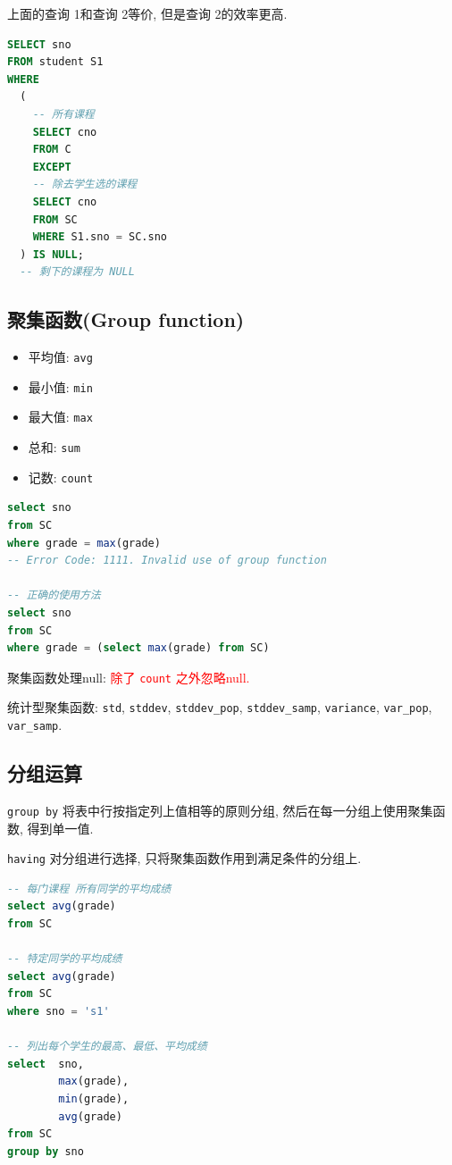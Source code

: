 上面的查询 1和查询 2等价, 但是查询 2的效率更高.

\begin{lstlisting}[language=SQL, caption={求出选修所有课程的同学}]
SELECT sno
FROM student S1
WHERE
  (
    -- 所有课程
    SELECT cno
    FROM C
    EXCEPT
    -- 除去学生选的课程
    SELECT cno
    FROM SC
    WHERE S1.sno = SC.sno
  ) IS NULL;
  -- 剩下的课程为 NULL
\end{lstlisting}

\subsection{聚集函数(Group function)}

\begin{itemize}
  \item 平均值: \verb|avg|
  \item 最小值: \verb|min|
  \item 最大值: \verb|max|
  \item 总和: \verb|sum|
  \item 记数: \verb|count|
\end{itemize}

\begin{lstlisting}[language=SQL, caption={聚集函数最容易犯的语法错误}]
select sno
from SC
where grade = max(grade)
-- Error Code: 1111. Invalid use of group function

-- 正确的使用方法
select sno
from SC
where grade = (select max(grade) from SC)
\end{lstlisting}

聚集函数处理null: \textcolor{red}{除了 \texttt{count} 之外忽略null.}

统计型聚集函数: \verb|std|, \verb|stddev|, \verb|stddev_pop|, \verb|stddev_samp|,
\verb|variance|, \verb|var_pop|, \verb|var_samp|.

\subsection{分组运算}

\verb|group by| 将表中行按指定列上值相等的原则分组, 然后在每一分组上使用聚集函数, 得到单一值.

\verb|having| 对分组进行选择, 只将聚集函数作用到满足条件的分组上.

\begin{lstlisting}[language=SQL]
-- 每门课程 所有同学的平均成绩
select avg(grade)
from SC

-- 特定同学的平均成绩
select avg(grade)
from SC
where sno = 's1'

-- 列出每个学生的最高、最低、平均成绩
select  sno,
        max(grade),
        min(grade),
        avg(grade)
from SC
group by sno
\end{lstlisting}

